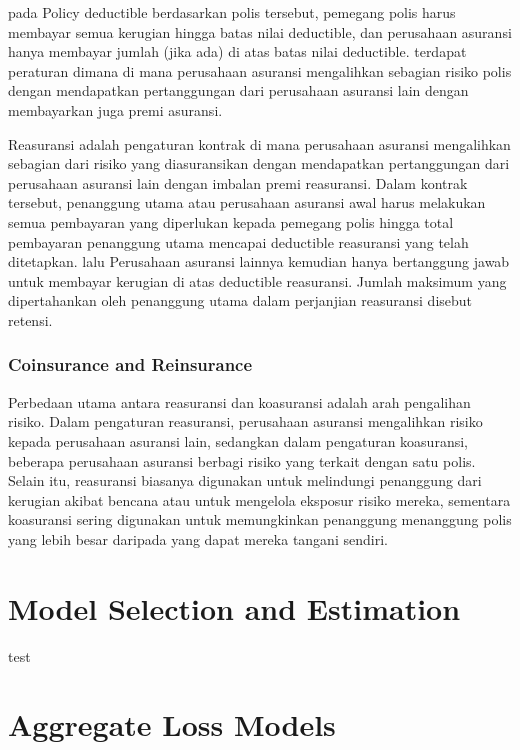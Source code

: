 \documentclass[
]{book}
\begin{document}
pada Policy deductible berdasarkan polis tersebut, pemegang polis harus membayar semua kerugian hingga batas nilai deductible, dan perusahaan asuransi hanya membayar jumlah (jika ada) di atas batas nilai deductible. terdapat peraturan dimana di mana perusahaan asuransi mengalihkan sebagian risiko polis dengan mendapatkan pertanggungan dari perusahaan asuransi lain dengan membayarkan juga premi asuransi.

Reasuransi adalah pengaturan kontrak di mana perusahaan asuransi mengalihkan sebagian dari risiko yang diasuransikan dengan mendapatkan pertanggungan dari perusahaan asuransi lain dengan imbalan premi reasuransi. Dalam kontrak tersebut, penanggung utama atau perusahaan asuransi awal harus melakukan semua pembayaran yang diperlukan kepada pemegang polis hingga total pembayaran penanggung utama mencapai deductible reasuransi yang telah ditetapkan. lalu Perusahaan asuransi lainnya kemudian hanya bertanggung jawab untuk membayar kerugian di atas deductible reasuransi. Jumlah maksimum yang dipertahankan oleh penanggung utama dalam perjanjian reasuransi disebut retensi.

\hypertarget{coinsurance-and-reinsurance}{%
\subsection{Coinsurance and Reinsurance}\label{coinsurance-and-reinsurance}}

Perbedaan utama antara reasuransi dan koasuransi adalah arah pengalihan risiko. Dalam pengaturan reasuransi, perusahaan asuransi mengalihkan risiko kepada perusahaan asuransi lain, sedangkan dalam pengaturan koasuransi, beberapa perusahaan asuransi berbagi risiko yang terkait dengan satu polis. Selain itu, reasuransi biasanya digunakan untuk melindungi penanggung dari kerugian akibat bencana atau untuk mengelola eksposur risiko mereka, sementara koasuransi sering digunakan untuk memungkinkan penanggung menanggung polis yang lebih besar daripada yang dapat mereka tangani sendiri.

\hypertarget{model-selection-and-estimation}{%
\chapter{Model Selection and Estimation}\label{model-selection-and-estimation}}

test

\hypertarget{aggregate-loss-models}{%
\chapter{Aggregate Loss Models}\label{aggregate-loss-models}}
\end{document}
